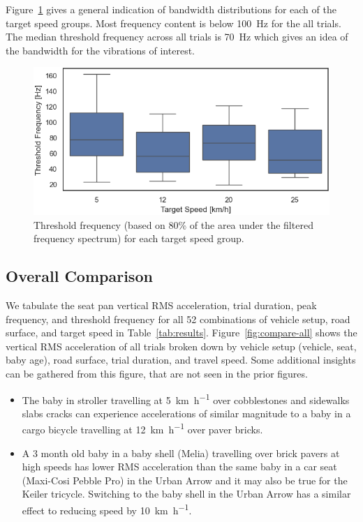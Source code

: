 \documentclass[a4paper]{article}
\begin{document}
Figure~\ref{fig:thresh-freq-dist} gives a general indication of bandwidth
distributions for each of the target speed groups. Most frequency content is
below 100~\si{\hertz} for the all trials. The median threshold frequency across
all trials is 70~\si{\hertz} which gives an idea of the bandwidth for the
vibrations of interest.
%
\begin{figure}
  \centering
  \includegraphics[width=160mm]{fig/SeatBotacc_ver-thresh-freq-dist.png}
  \caption{Threshold frequency  (based on 80\% of the area under the filtered
  frequency spectrum) for each target speed group.}
  \label{fig:thresh-freq-dist}
\end{figure}

\subsection{Overall Comparison}
We tabulate the seat pan vertical RMS acceleration, trial duration, peak
frequency, and threshold frequency for all 52 combinations of vehicle setup,
road surface, and target speed in Table~\ref{tab:results}.
Figure~\ref{fig:compare-all} shows the vertical RMS acceleration of all trials
broken down by vehicle setup (vehicle, seat, baby age), road surface, trial
duration, and travel speed. Some additional insights can be gathered from this
figure, that are not seen in the prior figures.
%
\begin{itemize}
    \item The baby in stroller travelling at 5~\si{\kilo\meter\per\hour} over
    cobblestones and sidewalks slabs cracks can experience accelerations of
    similar magnitude to a baby in a cargo bicycle travelling at
    12~\si{\kilo\meter\per\hour} over paver bricks.
    \item A 3 month old baby in a baby shell (Melia) travelling over brick
    pavers at high speeds has lower RMS acceleration than the same baby in a car
    seat (Maxi-Cosi Pebble Pro) in the Urban Arrow and it may also be true for
    the Keiler tricycle. Switching to the baby shell in the Urban Arrow has a
    similar effect to reducing speed by 10~\si{\kilo\meter\per\hour}.
\end{itemize}
\end{document}
